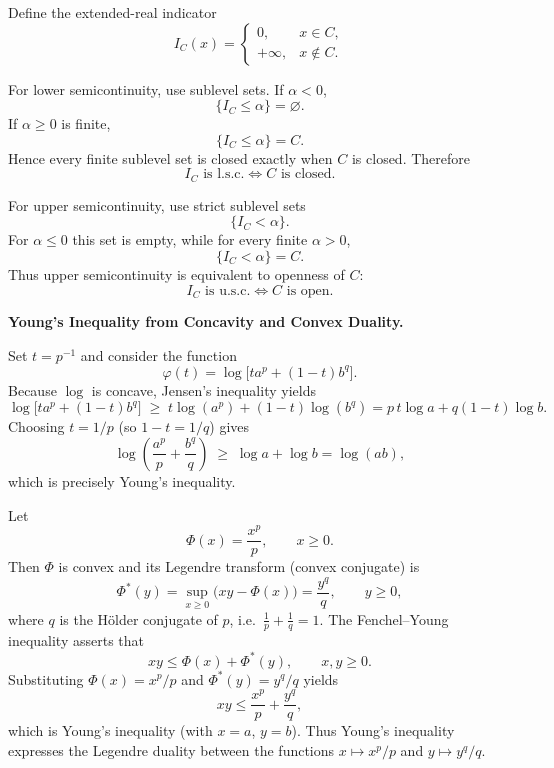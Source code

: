 \begin{solution}
Define the extended-real indicator
\[
I_C(x)
=
\begin{cases}
0,&x\in C,\\
+\infty,&x\notin C.
\end{cases}
\]

For lower semicontinuity, use sublevel sets. If \(\alpha<0\),
\[
\{I_C\le\alpha\}=\varnothing.
\]
If \(\alpha\ge0\) is finite,
\[
\{I_C\le\alpha\}=C.
\]
Hence every finite sublevel set is closed exactly when \(C\) is closed. Therefore
\[
\boxed{
I_C\text{ is l.s.c.}
\iff
C\text{ is closed}.
}
\]

For upper semicontinuity, use strict sublevel sets
\[
\{I_C<\alpha\}.
\]
For \(\alpha\le0\) this set is empty, while for every finite \(\alpha>0\),
\[
\{I_C<\alpha\}=C.
\]
Thus upper semicontinuity is equivalent to openness of \(C\):
\[
\boxed{
I_C\text{ is u.s.c.}
\iff
C\text{ is open}.
}
\]
\end{solution}


\begin{problem}[CP-II-0244]
\label{prob:cp-ii-0244}
\textbf{Young's Inequality from Concavity and Convex Duality.}

\hspace*{1.5em}Set $t = p^{-1}$ and consider the function
	\[
	\varphi(t) = \log\bigl[t a^p + (1-t)b^q\bigr].
	\]
	Because $\log$ is concave, Jensen's inequality yields
	\[
	\log\bigl[t a^p + (1-t)b^q\bigr]
	\;\ge\; t\log(a^p) + (1-t)\log(b^q)
	= p\,t\log a + q(1-t)\log b.
	\]
	Choosing $t=1/p$ (so $1-t=1/q$) gives
	\[
	\log\!\left(\frac{a^p}{p} + \frac{b^q}{q}\right)
	\;\ge\; \log a + \log b = \log(ab),
	\]
	which is precisely Young's inequality.

Let
\[
\Phi(x) = \frac{x^p}{p}, \qquad x\ge 0.
\]
Then $\Phi$ is convex and its Legendre transform (convex conjugate) is
\[
\Phi^*(y)
= \sup_{x\ge0}\bigl(xy - \Phi(x)\bigr)
= \frac{y^q}{q}, \qquad y\ge0,
\]
where $q$ is the Hölder conjugate of $p$, i.e.\ $\frac1p+\frac1q=1$.
The Fenchel--Young inequality asserts that
\[
xy \le \Phi(x) + \Phi^*(y), \qquad x,y\ge0.
\]
Substituting $\Phi(x)=x^p/p$ and $\Phi^*(y)=y^q/q$ yields
\[
xy \le \frac{x^p}{p} + \frac{y^q}{q},
\]
which is Young's inequality (with $x=a$, $y=b$).  Thus Young's
inequality expresses the Legendre duality between the functions
$x\mapsto x^p/p$ and $y\mapsto y^q/q$.

\bigskip
\end{problem}

